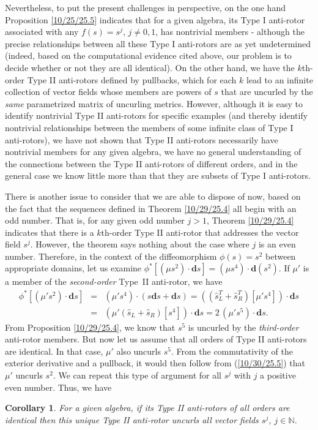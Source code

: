 \documentclass{amsart}
\newtheorem{corollary}[theorem]{Corollary}
\theoremstyle{definition}
\numberwithin{theorem}{section}
\numberwithin{equation}{section}
\begin{document}
Nevertheless, to put the present challenges in perspective, on the one hand Proposition \ref{10/25/25.5} indicates that for a given algebra, its Type I anti-rotor associated with any $f(s)=s^j$, $j\ne 0,1$, has nontrivial members - although the  precise relationships between all these Type I anti-rotors are as yet undetermined (indeed, based on the computational evidence cited above, our problem is to decide whether or not they are all identical).  On the other hand, we have the $k$th-order Type II anti-rotors defined by pullbacks, which for each $k$ lead to an infinite collection of vector fields whose members are powers of $s$ that are uncurled by the {\it same} parametrized matrix of uncurling metrics.  However, although it is easy to identify nontrivial Type II anti-rotors for specific examples (and thereby identify nontrivial relationships between the members of some infinite class of Type I anti-rotors), we have not shown that Type II anti-rotors necessarily have nontrivial members for any given algebra, we have no general understanding of the connections between the Type II anti-rotors of different orders, and in the general case we know little more than that they are subsets of Type I anti-rotors.

There is another issue to consider that we are able to dispose of now, based on the fact that the sequences defined in Theorem \ref{10/29/25.4} all begin with an odd number.
That is, for any given odd number $j>1$, Theorem \ref{10/29/25.4} indicates that there is a $k$th-order Type II anti-rotor that addresses the vector field $s^j$.  However, the theorem says nothing about the case where $j$ is an even number.  Therefore, in the context of the diffeomorphism $\phi(s)=s^2$ between appropriate domains, let us examine $\phi^* \left[(\mu s^2)\cdot\mathbf{d}s\right] =  (\mu s^4)\cdot \mathbf{d}(s^2)$.  If $\mu'$ is a member of the {\it second-order} \mbox{Type II} anti-rotor, we have  
\begin{eqnarray} \nonumber \phi^* \left[(\mu' s^2)\cdot\mathbf{d}s\right]  &=& (\mu' s^4)\cdot (s\mathbf{d}s+\mathbf{d}s) = \left((\hat{s}^T_L+\hat{s}_R^T) [\mu' s^4]\right)\cdot\mathbf{d}s \\  &=& (\mu'(\hat{s}_L+\hat{s}_R)[s^4])\cdot\mathbf{d}s =  2\, (\mu' s^5) \cdot \mathbf{d}s. \label{10/30/25.5}\end{eqnarray} 
From Proposition \ref{10/29/25.4}, we know that $s^5$ is uncurled by the {\it third-order} anti-rotor members.  But now let us assume that all orders of Type II anti-rotors are identical.  In that case, $\mu'$ also uncurls $s^5$.  From the commutativity of the exterior derivative and a pullback, it would then follow from (\ref{10/30/25.5}) that $\mu'$ uncurls $s^2$.  We can repeat this type of argument for all $s^j$ with $j$ a positive even number.  Thus, we have
\begin{corollary}\label{11/8/25.1} For a given algebra, if its Type II anti-rotors of all orders are identical then this unique Type II anti-rotor uncurls all vector fields $s^j$, $j\in\mathbb{N}$. \end{corollary}
\end{document}
